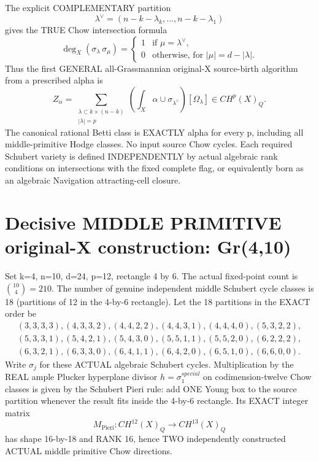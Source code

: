\documentclass[11pt]{article}
\begin{document}
The explicit COMPLEMENTARY partition
\[
\boxed{\lambda^\vee=
(n-k-\lambda_k,\ldots,n-k-\lambda_1)}
\]
gives the TRUE Chow intersection formula
\[
\deg_X(\sigma_\lambda\,\sigma_\mu)
=\begin{cases}1&\text{if }\mu=\lambda^\vee,\\
0&\text{otherwise, for }|\mu|=d-|\lambda|.
\end{cases}
\]
Thus the first GENERAL all-Grassmannian original-X
source-birth algorithm from a prescribed alpha is
\[
\boxed{
Z_\alpha=
\sum_{\substack{\lambda\subset k\times(n-k)\\|\lambda|=p}}
\left(\int_X\alpha\cup \sigma_{\lambda^\vee}\right)
[\Omega_\lambda]\in CH^p(X)_Q.
}\tag{1}
\]
The canonical rational Betti class is EXACTLY alpha
for every p, including all middle-primitive
Hodge classes. No input source Chow cycles.
Each required Schubert variety is defined
INDEPENDENTLY by actual algebraic rank conditions
on intersections with the fixed complete flag,
or equivalently born as an algebraic
Navigation attracting-cell closure.

\section{Decisive MIDDLE PRIMITIVE original-X construction: Gr(4,10)}
Set k=4, n=10, d=24, p=12, rectangle 4 by 6.
The actual fixed-point count is
\(\binom{10}{4}=210\).
The number of genuine independent
middle Schubert cycle classes is 18
(partitions of 12 in the 4-by-6 rectangle).
Let the 18 partitions in the EXACT order be
\[
\begin{gathered}
(3,3,3,3),(4,3,3,2),(4,4,2,2),
(4,4,3,1),(4,4,4,0),(5,3,2,2),\\
(5,3,3,1),(5,4,2,1),(5,4,3,0),
(5,5,1,1),(5,5,2,0),(6,2,2,2),\\
(6,3,2,1),(6,3,3,0),(6,4,1,1),
(6,4,2,0),(6,5,1,0),(6,6,0,0).
\end{gathered}
\]
Write \(\sigma_j\) for these ACTUAL algebraic
Schubert cycles. Multiplication by the REAL
ample Plucker hyperplane divisor \(h=\sigma_1^{special}\)
on codimension-twelve Chow classes is given by
the Schubert Pieri rule: add ONE Young box to
the source partition whenever the result fits
inside the 4-by-6 rectangle.
Its EXACT integer matrix
\[
M_{\mathrm{Pieri}}:
CH^{12}(X)_Q\to CH^{13}(X)_Q
\]
has shape 16-by-18 and RANK 16, hence
TWO independently constructed ACTUAL
middle primitive Chow directions.
\end{document}
